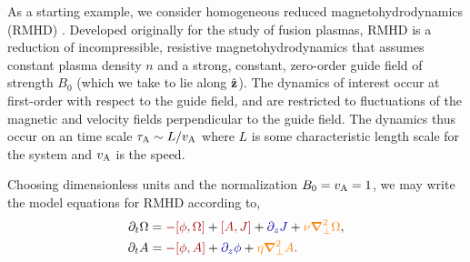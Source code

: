 \documentclass[12pt, letterpaper, oneside, leqno, openright]{memoir}
\begin{document}
%
%
%
%
%
%
As a starting example, we consider homogeneous reduced magnetohydrodynamics
(RMHD) \citep{KadomtsevPogutse74, Strauss76, Strauss77}. Developed originally
for the study of fusion plasmas, RMHD is a reduction of incompressible,
resistive magnetohydrodynamics that assumes constant plasma density $n$
and a strong, constant, zero-order guide field of strength $B_0$ (which we
take to lie along $\hat{\mathbf{z}}$). The dynamics of interest occur at first-order
with respect to the guide field, and are restricted to fluctuations
of the magnetic and velocity fields perpendicular to the guide field.
The dynamics thus occur on an \Alfven time scale
$\tau_{\mathrm{A}}\sim L/v_{\mathrm{A}}$ where $L$ is some characteristic length scale
for the system and $v_{\mathrm{A}}$ is the \Alfven speed.
%
\par
%
Choosing dimensionless units and the normalization $B_0=v_{\mathrm{A}}=1$, 
we may write the model equations for RMHD according to,
%
\begin{subequations}
\begin{align}
  \pardt\Omega &={\color{red!65!black}-[\phi,\Omega]} + {\color{red!65!black}[A,J]} 
                                                      + {\color{blue!65!black}\pardz J}   
                                                                                        + {\color{orange}\nu \delperp^2\Omega},\label{eq:rmhdvort}  \\
  \pardt A     &={\color{red!65!black}-[\phi,A]}      
                                                      + {\color{blue!65!black}\pardz\phi} 
                                                                                        + {\color{orange}\eta\delperp^2 A}     \label{eq:rmhdflux}.
\end{align}
\end{subequations}
\end{document}
